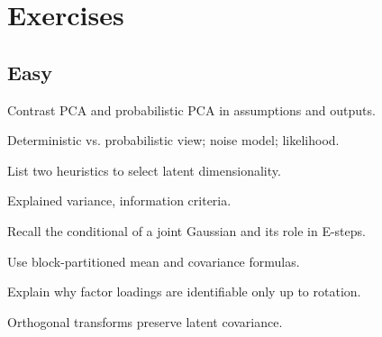 
\section*{Exercises}

\subsection*{Easy}

\begin{exercisebox}[easy]
\begin{problem}
Contrast PCA and probabilistic PCA in assumptions and outputs.
\end{problem}
\begin{hintbox}
Deterministic vs. probabilistic view; noise model; likelihood.
\end{hintbox}
\end{exercisebox}


\begin{exercisebox}[easy]
\begin{problem}
List two heuristics to select latent dimensionality.
\end{problem}
\begin{hintbox}
Explained variance, information criteria.
\end{hintbox}
\end{exercisebox}


\begin{exercisebox}[easy]
\begin{problem}
Recall the conditional of a joint Gaussian and its role in E-steps.
\end{problem}
\begin{hintbox}
Use block-partitioned mean and covariance formulas.
\end{hintbox}
\end{exercisebox}


\begin{exercisebox}[easy]
\begin{problem}
Explain why factor loadings are identifiable only up to rotation.
\end{problem}
\begin{hintbox}
Orthogonal transforms preserve latent covariance.
\end{hintbox}
\end{exercisebox}


